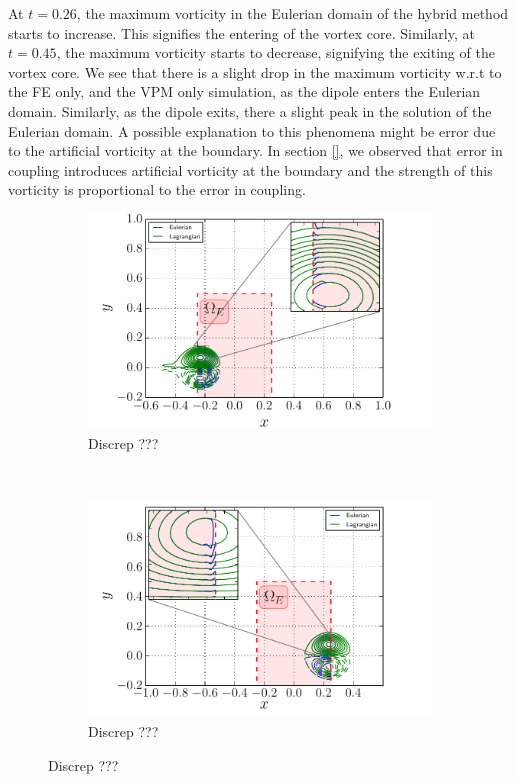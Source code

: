 At $t=0.26$, the maximum vorticity in the Eulerian domain of the hybrid method starts to increase. This signifies the entering of the vortex core. Similarly, at $t=0.45$, the maximum vorticity starts to decrease, signifying the exiting of the vortex core. We see that there is a slight drop in the maximum vorticity w.r.t to the FE only, and the VPM only simulation, as the dipole enters the Eulerian domain. Similarly, as the dipole exits, there a slight peak in the solution of the Eulerian domain. A possible explanation to this phenomena might be error due to the artificial vorticity at the boundary. In section \ref{}, we observed that error in coupling introduces artificial vorticity at the boundary and the strength of this vorticity is proportional to the error in coupling. 
	
	\begin{figure}[!h]
     \centering
     \begin{subfigure}[t]{0.48\textwidth}
             \includegraphics[width=\linewidth]{./figures/hybrid/cbConv/hybrid_doubleMonopoleConvection_entering2.pdf}
             \caption{Discrep ???}
             \label{fig:hybrid_doubleMonopoleConvection_entering2}
     \end{subfigure}     
     ~ %
     \begin{subfigure}[t]{0.48\textwidth}
             \includegraphics[width=\linewidth]{./figures/hybrid/cbConv/hybrid_doubleMonopoleConvection_exiting.pdf}
             \caption{Discrep ???}
             \label{fig:hybrid_doubleMonopoleConvection_exiting}
     \end{subfigure}        
     

\end{figure}

